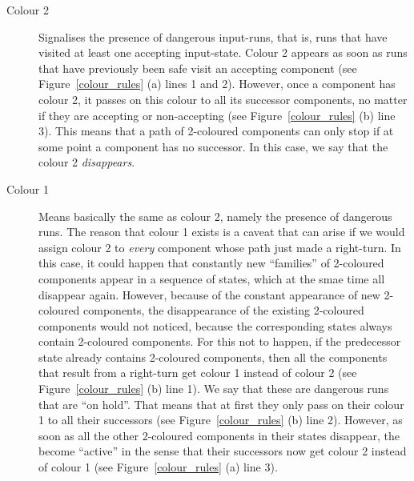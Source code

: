 {
\begin{description}
\item[Colour 2]
Signalises the presence of dangerous input-runs, that is, runs that have visited at least one accepting input-state. Colour 2 appears as soon as runs that have previously been safe visit an accepting component (see Figure~\ref{colour_rules} (a) lines 1 and 2). However, once a component has colour 2, it passes on this colour to all its successor components, no matter if they are accepting or non-accepting (see Figure~\ref{colour_rules} (b) line 3). This means that a path of 2-coloured components can only stop if at some point a component has no successor. In this case, we say that the colour 2 \textit{disappears}.



\item[Colour 1]
Means basically the same as colour 2, namely the presence of dangerous runs. The reason that colour 1 exists is a caveat that can arise if we would assign colour 2 to \textit{every} component whose path just made a right-turn. In this case, it could happen that constantly new ``families'' of 2-coloured components appear in a sequence of states, which at the smae time all disappear again. However, because of the constant appearance of new 2-coloured components, the disappearance of the existing 2-coloured components would not noticed, because  the corresponding states always contain 2-coloured components. For this not to happen, if the predecessor state already contains 2-coloured components, then all the components that result from a right-turn get colour 1 instead of colour 2 (see Figure~\ref{colour_rules} (b) line 1). We say that these are dangerous runs that are ``on hold''. That means that at first they only pass on their colour 1 to all their successors (see Figure~\ref{colour_rules} (b) line 2). However, as soon as all the other 2-coloured components in their states disappear, the become ``active'' in the sense that their successors now get colour 2 instead of colour 1 (see Figure~\ref{colour_rules} (a) line 3).


\end{description}}
